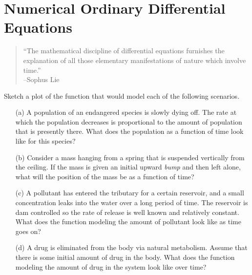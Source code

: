 \chapter{Numerical Ordinary Differential Equations}\label{ch:odes}
\begin{quote}
    ``The mathematical discipline of differential equations furnishes the explanation of
    all those elementary manifestations of nature which involve time.'' \\ --Sophus Lie
\end{quote}


\begin{problem}
    Sketch a plot of the function that would model each of the following scenarios.
    \begin{enumerate}
        \item[(a)] A population of an endangered species is slowly dying off.  The rate at
            which the population decreases is proportional to the amount of population
            that is presently there.  What does the population as a function of time look
            like for this species?
        \item[(b)] Consider a mass hanging from a spring that is suspended vertically from
            the ceiling.  If the mass is given an initial upward {\it bump} and then left
            alone, what will the position of the mass be as a function of time?
        \item[(c)] A pollutant has entered the tributary for a certain reservoir, and a
            small concentration leaks into the water over a long period of time.  The
            reservoir is dam controlled so the rate of release is well known and
            relatively constant.  What does the function modeling the amount of pollutant
            look like as time goes on?
        \item[(d)] A drug is eliminated from the body via natural metabolism.  Assume that
            there is some initial amount of drug in the body.  What does the function
            modeling the amount of drug in the system look like over time? 
    \end{enumerate}
\end{problem}

